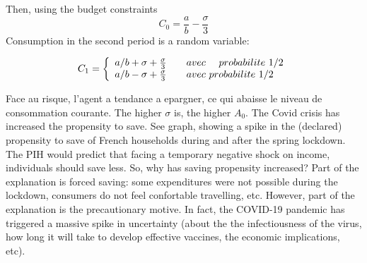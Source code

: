 \documentclass[a4paper,11pt]{article}
\begin{document}
\begin{enumerate}
Then, using the budget constraints
\begin{equation}
C_{0} =\frac{a}{b}-\frac{\sigma}{3} 
\label{2 - CB}
\end{equation}
Consumption in the second period is a random variable: 


\begin{equation}
C_1=\left\{ 
\begin{array}{l}
a/b +\sigma  +   \frac{\sigma}{3} \text{\qquad  } avec  \  \ \ \ probabilite \ 1/2 \\ 
a/b -\sigma +  \frac{\sigma}{3}  \text{\qquad } avec \ probabilite \  1/2  %
\end{array}%
\right.  \label{uti}
\end{equation}



\indent Face au risque, l'agent a tendance a epargner, ce qui abaisse le niveau de consommation courante. The higher $\sigma$ is, the higher $A_0$. The Covid crisis has increased the propensity to save.  See graph, showing a spike in the (declared) propensity to save of French households during and after the spring lockdown. The PIH would predict that facing a temporary negative shock on income, individuals should save less.  So, why has saving propensity increased? Part of the explanation is forced saving: some expenditures were not possible during the lockdown, consumers do not feel confortable travelling, etc. However, part of the explanation is the precautionary motive. In fact, the COVID-19 pandemic has triggered a massive spike in uncertainty (about the the infectiousness of the virus, how long it will take to develop effective vaccines, the economic implications, etc).  

\end{enumerate}
\end{document}
